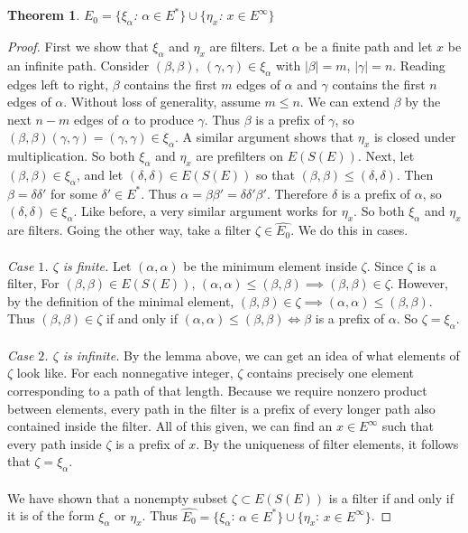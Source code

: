 \documentclass{article}
\newtheorem*{theorem}{Theorem}
\begin{document}
\begin{theorem} $\hat{E_0} = \{\xi_\alpha$: $\alpha \in E^*\} \cup \{\eta_x$: $x \in E^\infty\}$ \end{theorem}
\begin{proof}
First we show that $\xi_\alpha$ and $\eta_x$ are filters. Let $\alpha$ be a finite path and let $x$ be an infinite path.
Consider $(\beta, \beta), \ (\gamma, \gamma) \in \xi_\alpha$ with $|\beta| = m$, $|\gamma| = n$. 
Reading edges left to right, $\beta$ contains the first $m$ edges of $\alpha$ and $\gamma$ 
contains the first $n$ edges of $\alpha$. Without loss of generality, assume $m \leq n$. 
We can extend $\beta$ by the next $n - m$ edges of $\alpha$ to produce $\gamma$. Thus
$\beta$ is a prefix of $\gamma$, so $(\beta, \beta)(\gamma, \gamma) = (\gamma, \gamma) \in \xi_\alpha$.
A similar argument shows that $\eta_x$ is closed under multiplication. So both $\xi_\alpha$ and $\eta_x$ are prefilters
on $E(S(E))$. Next, let $(\beta, \beta) \in \xi_\alpha$, and let $(\delta, \delta) \in E(S(E))$ so that 
$(\beta, \beta) \leq (\delta, \delta)$. Then $\beta = \delta \delta'$ for some $\delta' \in E^*$. 
Thus $\alpha = \beta \beta' = \delta \delta' \beta'$. Therefore $\delta$ is a prefix of $\alpha$, so 
$(\delta, \delta) \in \xi_\alpha$. Like before, a very similar argument works for $\eta_x$. So both 
$\xi_\alpha$ and $\eta_x$ are filters. Going the other way, take a filter $\zeta \in \hat{E_0}$.
We do this in cases.
\\ \\
    \textit{Case $1$. $\zeta$ is finite.}
Let $(\alpha, \alpha)$ be the minimum element inside $\zeta$. Since $\zeta$ is a filter,
For $(\beta, \beta) \in E(S(E))$, $(\alpha, \alpha) \leq (\beta, \beta) \implies (\beta, \beta) \in \zeta$.
However, by the definition of the minimal element, $(\beta, \beta) \in \zeta \implies (\alpha, \alpha) \leq (\beta, \beta)$.
Thus $(\beta, \beta) \in \zeta$ if and only if $(\alpha, \alpha) \leq (\beta, \beta) \iff \beta$ is a prefix of $\alpha$. So $\zeta = \xi_\alpha$.
\\ \\
    \textit{Case $2$. $\zeta$ is infinite.}
By the lemma above, we can get an idea of what elements of $\zeta$ look like.
For each nonnegative integer, $\zeta$ contains precisely one element corresponding
to a path of that length. Because we require nonzero product between elements, every
path in the filter is a prefix of every longer path also contained inside the filter.
All of this given, we can find an $x \in E^\infty$ such that every path inside $\zeta$
is a prefix of $x$. By the uniqueness of filter elements, it follows that $\zeta = \xi_\alpha$.
\\ \\
We have shown that a nonempty subset $\zeta \subset E(S(E))$ is a filter if and only if
it is of the form $\xi_\alpha$ or $\eta_x$. Thus $\hat{E_0} = \{\xi_\alpha$: $\alpha \in E^*\} \cup \{\eta_x$: $x \in E^\infty\}$.
\end{proof}
\end{document}
